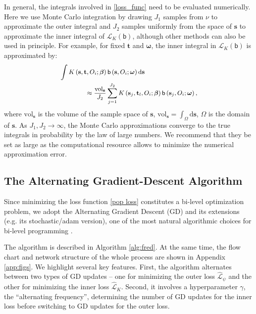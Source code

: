 \documentclass{article}
\def\sfb{\mathsf{b}}
\def\sfb{\mathsf{b}}
\theoremstyle{plain}
\theoremstyle{definition}
\theoremstyle{remark}
\def\diff{\mathrm{d}}
\def\bbeta{\boldsymbol{\beta}}
\def\hat{\widehat}
\begin{document}
In general, the integrals involved in \eqref{loss_func} need to be evaluated numerically. Here we use Monte Carlo integration \citep{liu2001monte} by drawing $J_{1}$ samples from $\nu$ to approximate the outer integral and $J_{2}$ samples uniformly from the space of $\mathbf{s}$ to approximate the inner integral of $\mathcal{L}_{K} (\sfb)$, although other methods can also be used in principle. For example, for fixed $\mathbf{t}$ and $\bm{\omega}$, the inner integral in $\mathcal{L}_{K} (\sfb)$ is approximated by:
\begin{equation*}
\small
\begin{aligned}
& \int K \left(\mathbf{s}, \mathbf{t}, O_i; \bbeta \right) \sfb\left(\mathbf{s},O_i;\bm{\omega} \right) \diff \mathbf{s} \\ & \quad \quad \quad \quad \approx 
\frac{\mathrm{vol}_{\mathbf{s}}}{J_2}\sum_{j=1}^{J_2} K\left(\mathbf{s}_j, \mathbf{t}_l,O_i; \bbeta\right) \sfb \left(\mathbf{s}_j,O_i;  \bm{\omega}\right),
\end{aligned}
\end{equation*}
where $\mathrm{vol}_{\mathbf{s}}$ is the volume of the sample space of $\mathbf{s}$, $\mathrm{vol}_{\mathbf{s}} = \int _\Omega \diff \mathbf{s}$, $\Omega$ is the domain of $\mathbf{s}$. As $J_{1}, J_{2} \rightarrow \infty$, the Monte Carlo approximations converge to the true integrals in probability by the law of large numbers. We recommend that they be set as large as the computational resource allows to minimize the numerical approximation error.

\subsection {The Alternating Gradient-Descent Algorithm}
\label{sec:opt}

Since minimizing the loss function \eqref{pop loss} constitutes a bi-level optimization problem, we adopt the Alternating Gradient Descent (GD) and its  extensions (e.g. its stochastic/adam version), one of the most natural algorithmic choices for bi-level programming \citep{finn2017model, chen2021closing}.

The algorithm is described in Algorithm \ref{alg:fred}. At the same time, the flow chart and network structure of the whole process are shown in Appendix \ref{app:figs}. We highlight several key features. First, the algorithm alternates between two types of GD updates -- one for minimizing the outer loss $\hat{\mathcal{L}}_{\psi}$ and the other for minimizing the inner loss $\hat{\mathcal{L}}_{K}$. Second, it involves a hyperparameter $\gamma$, the ``alternating frequency'', determining the number of GD updates for the inner loss before switching to GD updates for the outer loss.
\end{document}
